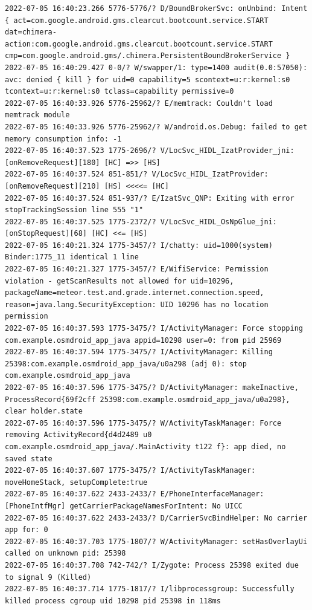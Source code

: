 \documentclass[a4paper,12pt]{book}
\begin{document}
\begin{lstlisting}
2022-07-05 16:40:23.266 5776-5776/? D/BoundBrokerSvc: onUnbind: Intent { act=com.google.android.gms.clearcut.bootcount.service.START dat=chimera-action:com.google.android.gms.clearcut.bootcount.service.START cmp=com.google.android.gms/.chimera.PersistentBoundBrokerService }
2022-07-05 16:40:29.427 0-0/? W/swapper/1: type=1400 audit(0.0:57050): avc: denied { kill } for uid=0 capability=5 scontext=u:r:kernel:s0 tcontext=u:r:kernel:s0 tclass=capability permissive=0
2022-07-05 16:40:33.926 5776-25962/? E/memtrack: Couldn't load memtrack module
2022-07-05 16:40:33.926 5776-25962/? W/android.os.Debug: failed to get memory consumption info: -1
2022-07-05 16:40:37.523 1775-2696/? V/LocSvc_HIDL_IzatProvider_jni: [onRemoveRequest][180] [HC] =>> [HS]
2022-07-05 16:40:37.524 851-851/? V/LocSvc_HIDL_IzatProvider: [onRemoveRequest][210] [HS] <<<<= [HC]
2022-07-05 16:40:37.524 851-937/? E/IzatSvc_QNP: Exiting with error stopTrackingSession line 555 "1"
2022-07-05 16:40:37.525 1775-2372/? V/LocSvc_HIDL_OsNpGlue_jni: [onStopRequest][68] [HC] <<= [HS]
2022-07-05 16:40:21.324 1775-3457/? I/chatty: uid=1000(system) Binder:1775_11 identical 1 line
2022-07-05 16:40:21.327 1775-3457/? E/WifiService: Permission violation - getScanResults not allowed for uid=10296, packageName=meteor.test.and.grade.internet.connection.speed, reason=java.lang.SecurityException: UID 10296 has no location permission
2022-07-05 16:40:37.593 1775-3475/? I/ActivityManager: Force stopping com.example.osmdroid_app_java appid=10298 user=0: from pid 25969
2022-07-05 16:40:37.594 1775-3475/? I/ActivityManager: Killing 25398:com.example.osmdroid_app_java/u0a298 (adj 0): stop com.example.osmdroid_app_java
2022-07-05 16:40:37.596 1775-3475/? D/ActivityManager: makeInactive, ProcessRecord{69f2cff 25398:com.example.osmdroid_app_java/u0a298}, clear holder.state
2022-07-05 16:40:37.596 1775-3475/? W/ActivityTaskManager: Force removing ActivityRecord{d4d2489 u0 com.example.osmdroid_app_java/.MainActivity t122 f}: app died, no saved state
2022-07-05 16:40:37.607 1775-3475/? I/ActivityTaskManager: moveHomeStack, setupComplete:true
2022-07-05 16:40:37.622 2433-2433/? E/PhoneInterfaceManager: [PhoneIntfMgr] getCarrierPackageNamesForIntent: No UICC
2022-07-05 16:40:37.622 2433-2433/? D/CarrierSvcBindHelper: No carrier app for: 0
2022-07-05 16:40:37.703 1775-1807/? W/ActivityManager: setHasOverlayUi called on unknown pid: 25398
2022-07-05 16:40:37.708 742-742/? I/Zygote: Process 25398 exited due to signal 9 (Killed)
2022-07-05 16:40:37.714 1775-1817/? I/libprocessgroup: Successfully killed process cgroup uid 10298 pid 25398 in 118ms

\end{lstlisting}
\end{document}
